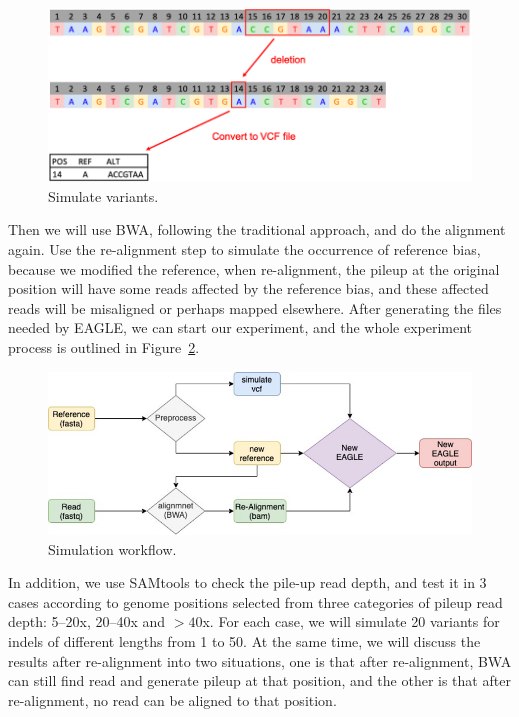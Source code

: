 \begin{figure}[ht]
\vspace{1em}
\includegraphics[width=1\columnwidth]{body/image/4-1.png}
\caption[Simulate variants]{Simulate variants.}
\label{f4-1}
\end{figure}

Then we will use BWA, following the traditional approach, and do the alignment again. Use the re-alignment step to simulate the occurrence of reference bias, because we modified the reference, when re-alignment, the pileup at the original position will have some reads affected by the reference bias, and these affected reads will be misaligned or perhaps mapped elsewhere. After generating the files needed by EAGLE, we can start our experiment, and the whole experiment process is outlined in Figure~\ref{f4-2}.

\begin{figure}[ht]
\vspace{1em}
\includegraphics[width=1\columnwidth]{body/image/4-2.png}
\caption[Simulation workflow]{Simulation workflow.}
\label{f4-2}
\end{figure}

In addition, we use SAMtools to check the pile-up read depth, and test it in 3 cases according to genome positions selected from three categories of pileup read depth: 5--20x, 20--40x and $>40$x.
For each case, we will simulate 20 variants for indels of different lengths from 1 to 50. At the same time, we will discuss the results after re-alignment into two situations, one is that after re-alignment, BWA can still find read and generate pileup at that position, and the other is that after re-alignment, no read can be aligned to that position.

